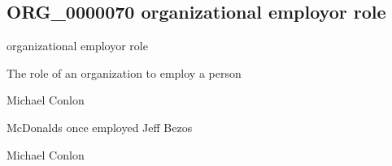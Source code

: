 \documentclass[letterpaper,10pt,english]{sphinxmanual}
\begin{document}
\subsection{ORG\_0000070 \sphinxhyphen{} organizational employor role}
\label{\detokenize{doc-ORG_0000070:org-0000070-organizational-employor-role}}\label{\detokenize{doc-ORG_0000070:index-0}}\label{\detokenize{doc-ORG_0000070::doc}}
\begin{sphinxShadowBox}

\sphinxAtStartPar
organizational employor role
\end{sphinxShadowBox}

\begin{sphinxShadowBox}

\sphinxAtStartPar
{\hyperref[\detokenize{doc-BFO_0000023::doc}]{}}
\end{sphinxShadowBox}

\begin{sphinxShadowBox}

\sphinxAtStartPar
The role of an organization to employ a person
\end{sphinxShadowBox}

\begin{sphinxShadowBox}

\sphinxAtStartPar
Michael Conlon 
\end{sphinxShadowBox}

\begin{sphinxShadowBox}

\sphinxAtStartPar
McDonalds once employed Jeff Bezos
\end{sphinxShadowBox}

\begin{sphinxShadowBox}

\sphinxAtStartPar
Michael Conlon 
\end{sphinxShadowBox}
\begin{quote}

\ignorespaces \end{quote}
\end{document}
